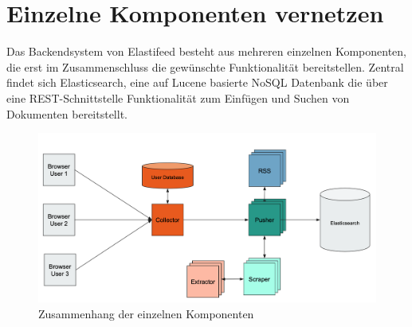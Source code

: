 \section{Einzelne Komponenten vernetzen}

Das Backendsystem von Elastifeed besteht aus mehreren einzelnen Komponenten, die erst im Zusammenschluss die gewünschte Funktionalität bereitstellen.
Zentral findet sich Elasticsearch, eine auf Lucene basierte NoSQL Datenbank die über eine REST-Schnittstelle Funktionalität zum Einfügen und Suchen von Dokumenten bereitstellt.\cite{es}

\begin{figure}[t]
        \centering
        \includegraphics[width=\linewidth]{images/architecture.png}
        \caption{Zusammenhang der einzelnen Komponenten}
        \label{deploy:image:architecture}
 \end{figure}
